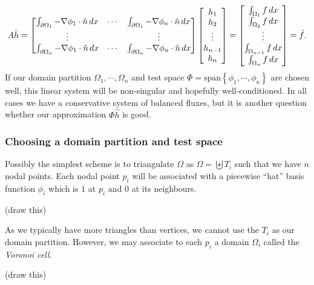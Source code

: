 \newcommand{\integralentry}[2]{\int_{\pom_{#1}}-\nabla\phi_{#2}\cdot\hat{n}\,dx}
\begin{equation}\label{poisson_matrix_equation}
    A\hat{h} = \begin{bmatrix}
            \integralentry{1}{1} & \cdots & \integralentry{1}{n} \\
            \vdots & & \vdots \\
            \integralentry{n}{1} & \cdots & \integralentry{n}{n}
            \end{bmatrix}
    \begin{bmatrix} h_1 \\ h_2 \\ \vdots \\ h_{n-1} \\ h_n \end{bmatrix}
    =
    \begin{bmatrix} \int_{\om_1}f\,dx \\ \int_{\om_2}f\,dx \\ \vdots \\ \int_{\om_{n-1}}f\,dx \\ \int_{\om_n}f\,dx \end{bmatrix}
    = \hat{f}.
\end{equation}
If our domain partition $\Omega_1,\cdots,\Omega_n$ and test space $\Phi = \text{span}\left\{\phi_1,\cdots,\phi_n\right\}$
are chosen well, this linear system will be non-singular and hopefully well-conditioned.
In all cases we have a conservative system of balanced fluxes, but it is another question whether our approximation
$\Phi\hat{h}$ is good.

\subsubsection{Choosing a domain partition and test space}
Possibly the simplest scheme is to triangulate $\Omega$ as
    $\Omega = \biguplus T_i$
such that we have $n$ nodal points.
Each nodal point $p_i$ will be associated with a piecewise ``hat'' basis function $\phi_i$ which is $1$ at $p_i$ and
$0$ at its neighbours.

\vskip 0.2in
(draw this)
\vskip 0.2in

As we typically have more triangles than vertices, we cannot use the $T_i$ as our domain partition. However, we may
associate to each $p_i$ a domain $\Omega_i$ called the \textit{Voronoi cell}.

\vskip 0.2in
(draw this)
\vskip 0.2in

